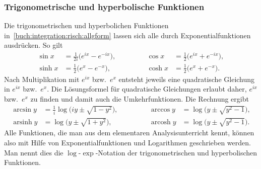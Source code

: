 \subsubsection{Trigonometrische und hyperbolische Funktionen}
Die trigonometrischen und hyperbolichen Funktionen
in~\eqref{buch:integration:risch:allgform}
lassen sich alle durch Exponentialfunktionen ausdrücken.
So gilt
\begin{equation}
\begin{aligned}
\sin x &= \frac{1}{2i}\bigl( e^{ix} - e^{-ix}\bigr),
&
&\qquad&
\cos x &= \frac{1}{2}\bigl( e^{ix} + e^{-ix}\bigr),
\\
\sinh x &= \frac12\bigl( e^x - e^{-x} \bigr),
&
&\qquad&
\cosh x &= \frac12\bigl( e^x + e^{-x} \bigr).
\end{aligned}
\label{buch:integral:risch:trighyp}
\end{equation}
Nach Multiplikation mit $e^{ix}$ bzw.~$e^{x}$ entsteht jeweils eine
quadratische Gleichung in $e^{ix}$ bzw.~$e^{x}$.
Die Lösungsformel für quadratische Gleichungen erlaubt daher, $e^{ix}$
bzw.~$e^{x}$ zu finden und damit auch die Umkehrfunktionen.
Die Rechnung ergibt
\begin{equation}
\begin{aligned}
\arcsin y
&=
\frac{1}{i}\log\bigl(
iy\pm\sqrt{1-y^2}
\bigr),
&
&\qquad&
\arccos y
&=
\log\bigl(
y\pm \sqrt{y^2-1}
\bigr),
\\
\operatorname{arsinh}y
&=
\log\bigl(
y \pm \sqrt{1+y^2}
\bigr),
&
&\qquad&
\operatorname{arcosh} y
&=
\log\bigl(
y\pm \sqrt{y^2-1}
\bigr).
\end{aligned}
\label{buch:integral:risch:trighypinv}
\end{equation}
Alle Funktionen, die man aus dem elementaren Analysisunterricht
kennt, können also mit Hilfe von Exponentialfunktionen und Logarithmen
geschrieben werden.
Man nennt dies die $\log$-$\exp$-Notation der trigonometrischen
und hyperbolischen Funktionen.
%

